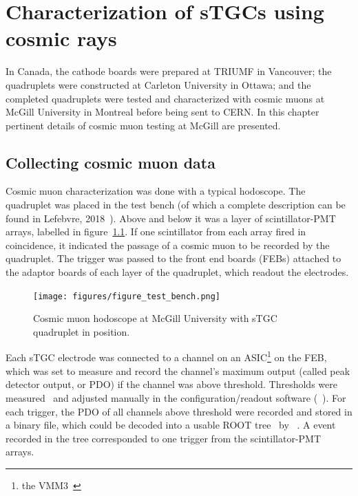 

\chapter{Characterization of sTGCs using cosmic rays}
\label{chap:cosmics}

In Canada, the cathode boards were prepared at TRIUMF in Vancouver; the quadruplets were constructed at Carleton University in Ottawa; and the completed quadruplets were tested and characterized with cosmic muons at McGill University in Montreal before being sent to CERN. In this chapter pertinent details of cosmic muon testing at McGill are presented. 

\section{Collecting cosmic muon data}

Cosmic muon characterization was done with a typical hodoscope.  The quadruplet was placed in the test bench (of which a complete description can be found in Lefebvre, 2018~\cite{lefebvre_thesis}). Above and below it was a layer of scintillator-PMT arrays, labelled in figure~\ref{fig:hodoscope}. If one scintillator from each array fired in coincidence, it indicated the passage of a cosmic muon to be recorded by the quadruplet. The trigger was passed to the front end boards (FEBs) attached to the adaptor boards of each layer of the quadruplet, which readout the electrodes.

\begin{figure}
    \centering
    \texttt{[image: figures/figure\_test\_bench.png]}
    \caption{Cosmic muon hodoscope at McGill University with sTGC quadruplet in position.}
    \label{fig:hodoscope}
\end{figure}

Each sTGC electrode was connected to a channel on an ASIC\footnote{the VMM3~\cite{iakovidis_vmm3_2017}} on the FEB, which was set to measure and record the channel's maximum output (called peak detector output, or PDO) if the channel was above threshold. Thresholds were measured~\cite{chen_calibration_2019} and adjusted manually in the configuration/readout software (~\cite{siyuan_sun_stgc_readout_sw}). For each trigger, the PDO of all channels above threshold were recorded and stored in a binary file, which could be decoded into a usable ROOT tree~\cite{ROOT} by ~\cite{lefebvre_tgc_analysis}. A event recorded in the tree corresponded to one trigger from the scintillator-PMT arrays. 

